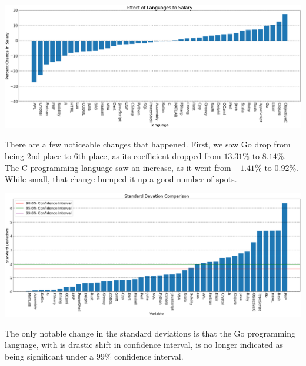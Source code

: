 \documentclass{report}
\begin{document}
\vspace{0.5in}

\includegraphics[width=0.9\linewidth]{model2coefficientlanguages.png}

\vspace{0.5in}

There are a few noticeable changes that happened. First, we saw Go drop from being 2nd place to 6th place, as its coefficient dropped from $13.31\%$ to $8.14\%$. The C programming language saw an increase, as it went from $-1.41\%$ to $0.92\%$. While small, that change bumped it up a good number of spots.


\vspace{0.5in}

\includegraphics[width=0.9\linewidth]{model2confidencelanguages.png}

\vspace{0.5in}

The only notable change in the standard deviations is that the Go programming language, with is drastic shift in confidence interval, is no longer indicated as being significant under a $99\%$ confidence interval.
\end{document}
